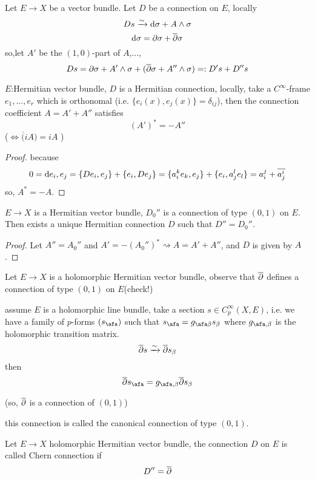 \begin{rem}Let $E\to X$ be a %
vector bundle.
Let $D$ be a connection on $E$, locally
$$Ds\xrightarrow{\sim}\mathrm{d}\sigma+A\wedge\sigma$$
$$\mathrm{d}\sigma=\partial\sigma+\overline{\partial}\sigma$$
so,let $A'$ be the $(1,0)$-part of $A$,...,
$$Ds=\partial\sigma+A'\wedge\sigma+(\overline{\partial}\sigma+A''\wedge\sigma)=:D's+D''s$$
\end{rem}

\begin{prop}
$E$:Hermitian vector bundle, $D$ is a Hermitian connection, locally,
take a $C^\infty$-frame $e_1,...,e_r$ which is orthonomal
(i.e. $\{e_i(x),e_j(x)\}=\delta_{ij}$), then the  connection coefficient
$A=A'+A''$ satisfies
$$(A')^*=-A''$$
($\iff \overline(iA)=iA$ )
\end{prop}

\begin{proof}
because
$$0=\mathrm{d}{e_i,e_j}=\{De_i,e_j\}+\{e_i,De_j\}
=\{a_i^ke_k,e_j\}+\{e_i,a_j^le_l\}
=a^j_i+\overline{a^i_j}$$
so, $A^*=-A$.
\end{proof}

\begin{cor}
$E\to X$ is a Hermitian vector bundle,
$D_0''$ is a connection of type $(0,1)$ on $E$.
Then exists a unique Hermitian connection $D$
such that $D''=D_0''$.
\end{cor}

\begin{proof}
Let $A''=A_0''$ and $A'=-(A_0'')^*\rightsquigarrow A=A'+A''$, and
$D$ is given by $A$.
\end{proof}

Let $E\to X$ is a holomorphic Hermitian vector bundle,
observe that $\overline{\partial}$ defines a connection of type $(0,1)$ on $E$(check!)

assume $E$ is a holomorphic line bundle, take a section
$s\in C_p^\infty(X,E)$, i.e. we have a family of $p$-forms $(s_\afa)$
such that $s_\afa=g_{\afa\beta}s_\beta$
where $g_{\afa,\beta}$ is the holomorphic transition matrix.
$$\overline{\partial} s\xrightarrow{\sim}\overline{\partial} s_\beta$$
then
$$\pbar s_\afa=g_{\afa,\beta}\pbar s_\beta$$

(so, $\overline{\partial}$ is a connection of $(0,1)$)

this connection is called the canonical connection of type $(0,1)$.

\begin{definition}
Let $E\to X$ holomorphic Hermitian vector bundle,
the connection $D$ on $E$ is called Chern connection if
$$D''=\overline{\partial}$$
\end{definition}

